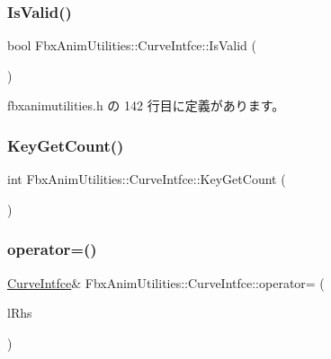 \subsubsection{\texorpdfstring{Is\+Valid()}{IsValid()}}
{\footnotesize\ttfamily bool Fbx\+Anim\+Utilities\+::\+Curve\+Intfce\+::\+Is\+Valid (\begin{DoxyParamCaption}{ }\end{DoxyParamCaption})\hspace{0.3cm}{\ttfamily [inline]}}



 fbxanimutilities.\+h の 142 行目に定義があります。

\mbox{\label{class_fbx_anim_utilities_1_1_curve_intfce_a3de48a3e798575552845f49e92f9b7a6}} 
\subsubsection{\texorpdfstring{Key\+Get\+Count()}{KeyGetCount()}}
{\footnotesize\ttfamily int Fbx\+Anim\+Utilities\+::\+Curve\+Intfce\+::\+Key\+Get\+Count (\begin{DoxyParamCaption}{ }\end{DoxyParamCaption})}

\mbox{\label{class_fbx_anim_utilities_1_1_curve_intfce_a0917c685f7bc760a34bf2faf9278eb2c}} 
\subsubsection{\texorpdfstring{operator=()}{operator=()}}
{\footnotesize\ttfamily \hyperlink{class_fbx_anim_utilities_1_1_curve_intfce}{Curve\+Intfce}\& Fbx\+Anim\+Utilities\+::\+Curve\+Intfce\+::operator= (\begin{DoxyParamCaption}\item[{\hyperlink{class_fbx_anim_utilities_1_1_curve_intfce}{Curve\+Intfce} \&}]{l\+Rhs }\end{DoxyParamCaption})\hspace{0.3cm}{\ttfamily [inline]}}




